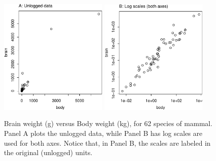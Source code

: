 \documentclass[12pt, a4paper,  BCOR=8.25mm, DIV=15]{scrartcl}\usepackage[]{graphicx}\usepackage[]{color}
\newenvironment{knitrout}{}{} %
\begin{document}
\begin{figure}
\begin{knitrout}
\color{fgcolor}

{\centering \includegraphics[width=0.47\textwidth]{figure/exs-fig3_1e-1} 
\includegraphics[width=0.47\textwidth]{figure/exs-fig3_1e-2} 

}



\end{knitrout}
\caption{Brain weight (g) versus Body weight (kg), for 62 species of mammal.
Panel A plots the unlogged data, while Panel B has log scales are used for
both axes. Notice that, in Panel B, the scales are
  labeled in the original (unlogged) units.
  \label{fig:Animals}}
\end{figure}
\end{document}
